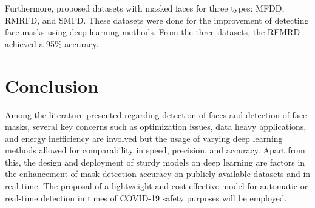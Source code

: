 \documentclass[a4paper,12pt]{article}
\begin{document}
Furthermore, \cite{wang2020masked} proposed datasets with masked faces for three types: MFDD, RMRFD, and SMFD. These datasets were done for the improvement of detecting face masks using deep learning methods. From the three datasets, the RFMRD achieved a 95\% accuracy.

\newpage
\section{Conclusion}
Among the literature presented regarding detection of faces and detection of face masks, several key concerns such as optimization issues, data heavy applications, and energy inefficiency are involved but the usage of varying deep learning methods allowed for comparability in speed, precision, and accuracy.  Apart from this, the design and deployment of sturdy models on deep learning are factors in the enhancement of mask detection accuracy on publicly available datasets and in real-time. The proposal of a lightweight and cost-effective model for automatic or real-time detection in times of COVID-19 safety purposes will be employed.

\newpage


\end{document}
